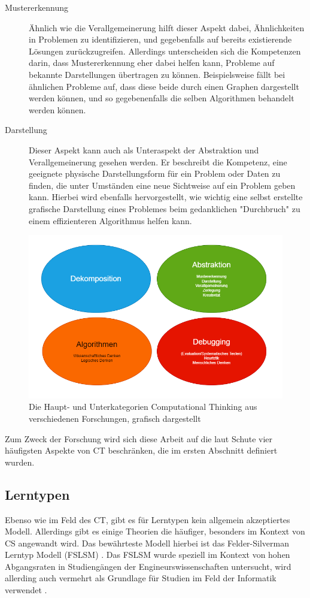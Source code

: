 \begin{description}
    \item[Mustererkennung] Ähnlich wie die Verallgemeinerung hilft dieser Aspekt dabei, Ähnlichkeiten in Problemen zu identifizieren, und gegebenfalls auf bereits existierende Lösungen zurückzugreifen. Allerdings unterscheiden sich die Kompetenzen darin, dass Mustererkennung eher dabei helfen kann, Probleme auf bekannte Darstellungen übertragen zu können. Beispielsweise fällt bei ähnlichen Probleme auf, dass diese beide durch einen Graphen dargestellt werden können, und so gegebenenfalls die selben Algorithmen behandelt werden können.
    \item[Darstellung] Dieser Aspekt kann auch als Unteraspekt der Abstraktion und Verallgemeinerung gesehen werden. Er beschreibt die Kompetenz, eine geeignete physische Darstellungsform für ein Problem oder Daten zu finden, die unter Umständen eine neue Sichtweise auf ein Problem geben kann. Hierbei wird ebenfalls hervorgestellt, wie wichtig eine selbst erstellte grafische Darstellung eines Problemes beim gedanklichen "Durchbruch" zu einem effizienteren Algorithmus helfen kann.
\end{description}

\begin{figure}[H]
    \centering
    \includegraphics[width=1\linewidth]{Figures/Section_2/CT}
    \caption{Die Haupt- und Unterkategorien Computational Thinking aus verschiedenen Forschungen, grafisch dargestellt}
\end{figure}

Zum Zweck der Forschung wird sich diese Arbeit auf die laut Schute vier häufigsten Aspekte von CT beschränken, die im ersten Abschnitt definiert wurden.

\subsection{Lerntypen}
Ebenso wie im Feld des CT, gibt es für Lerntypen kein allgemein akzeptiertes Modell. Allerdings gibt es einige Theorien die häufiger, besonders im Kontext von CS angewandt wird. Das bewährteste Modell hierbei ist das Felder-Silverman Lerntyp Modell (FSLSM) \cite{felder}. 
Das FSLSM wurde speziell im Kontext von hohen Abgangsraten in Studiengängen der Engineurswissenschaften untersucht, wird allerding auch vermehrt als Grundlage für Studien im Feld der Informatik verwendet \cite{kumar}.

